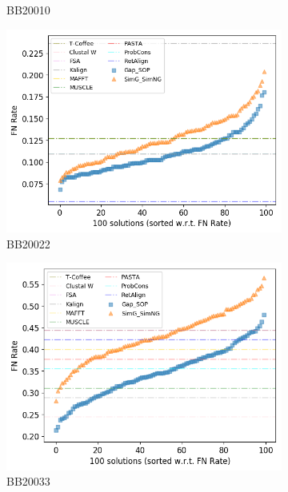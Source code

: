 \begin{figure}[!htbp]
\begin{adjustwidth}{-1cm}{-1cm}
\begin{subfigure}{0.22\textwidth}
			\caption{BB20010}
		\end{subfigure}
		\begin{subfigure}{0.22\textwidth}
			\includegraphics[width=\columnwidth]{Figure/summary/precomputedInit/Balibase/BB20022_fnrate_density_single_run}
			\caption{BB20022}
		\end{subfigure}
		\begin{subfigure}{0.22\textwidth}
			\includegraphics[width=\columnwidth]{Figure/summary/precomputedInit/Balibase/BB20033_fnrate_density_single_run}
			\caption{BB20033}
		\end{subfigure}
		\begin{subfigure}{0.22\textwidth}

\end{subfigure}
\end{adjustwidth}
\end{figure}
